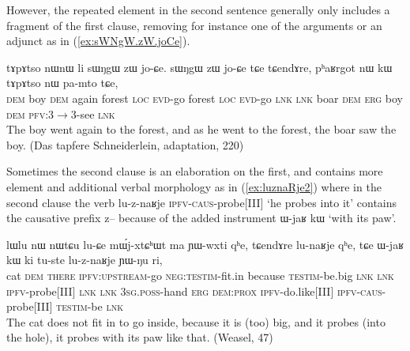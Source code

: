 \documentclass[oldfontcommands,oneside,a4paper,11pt]{article}
\newcommand{\ipa}[1]{{\phon \mbox{#1}}} %
\newcommand{\refb}[1]{(\ref{#1})}
\begin{document}
However, the repeated element in the second sentence generally only includes a fragment of the first clause, removing for instance one of the arguments or an adjunct as in \refb{ex:sWNgW.zW.joCe}.

 \begin{exe}
\ex \label{ex:sWNgW.zW.joCe}
\gll 	\ipa{nɯ} 	\ipa{tɤpɤtso} 	\ipa{nɯnɯ} 	\ipa{li} 	\ipa{sɯŋgɯ} 	\ipa{zɯ} 	\ipa{jo-ɕe.} 	\ipa{sɯŋgɯ} 	\ipa{zɯ} 	\ipa{jo-ɕe} 	\ipa{tɕe} 	\ipa{tɕendɤre,} 	\ipa{pʰaʁrgot} 	\ipa{nɯ} 	\ipa{kɯ} 	\ipa{tɤpɤtso} 	\ipa{nɯ} 	\ipa{pa-mto} 	\ipa{tɕe,} 	\\
  \textsc{dem} boy \textsc{dem} again forest \textsc{loc} \textsc{evd}-go  forest \textsc{loc} \textsc{evd}-go \textsc{lnk} \textsc{lnk} boar \textsc{dem} \textsc{erg} boy \textsc{dem} \textsc{pfv}:3$\rightarrow$3-see \textsc{lnk}   \\
\glt The boy went again to the forest, and as he went to the forest, the boar saw the boy. (Das tapfere Schneiderlein, adaptation, 220)
\end{exe}


 

Sometimes the second clause is an elaboration on the first, and contains more element and additional verbal morphology as in \refb{ex:luznaRje2} where in the second clause the verb \ipa{lu-z-naʁje} \textsc{ipfv-caus}-probe[III] `he probes into it' contains the causative prefix \ipa{z--} because of the added instrument \ipa{ɯ-jaʁ} 	\ipa{kɯ}  `with its paw'.

\begin{exe}
\ex \label{ex:luznaRje2}
\gll
\ipa{lɯlu} 	\ipa{nɯ} 	\ipa{nɯtɕu} 	\ipa{lu-ɕe} 	\ipa{mɯ́j-xtɕʰɯt} 	\ipa{ma} 	\ipa{ɲɯ-wxti} 	\ipa{qʰe,} 	\ipa{tɕendɤre} 	\ipa{lu-naʁje} 	\ipa{qʰe,}  \ipa{tɕe} 	\ipa{ɯ-jaʁ} 	\ipa{kɯ} 	\ipa{ki} 	\ipa{tu-ste} 	\ipa{lu-z-naʁje} 	\ipa{ɲɯ-ŋu} 	\ipa{ri,} \\
cat \textsc{dem} \textsc{there} \textsc{ipfv:upstream}-go  \textsc{neg:testim}-fit.in because \textsc{testim}-be.big \textsc{lnk}  \textsc{lnk} \textsc{ipfv}-probe[III] \textsc{lnk} \textsc{lnk} \textsc{3sg.poss}-hand \textsc{erg} \textsc{dem:prox} \textsc{ipfv}-do.like[III] \textsc{ipfv-caus}-probe[III] \textsc{testim}-be \textsc{lnk} \\
\glt The cat does not fit in to go inside, because it is (too) big, and it probes (into the hole), it probes with its paw like that. (Weasel, 47)
\end{exe}
\end{document}
